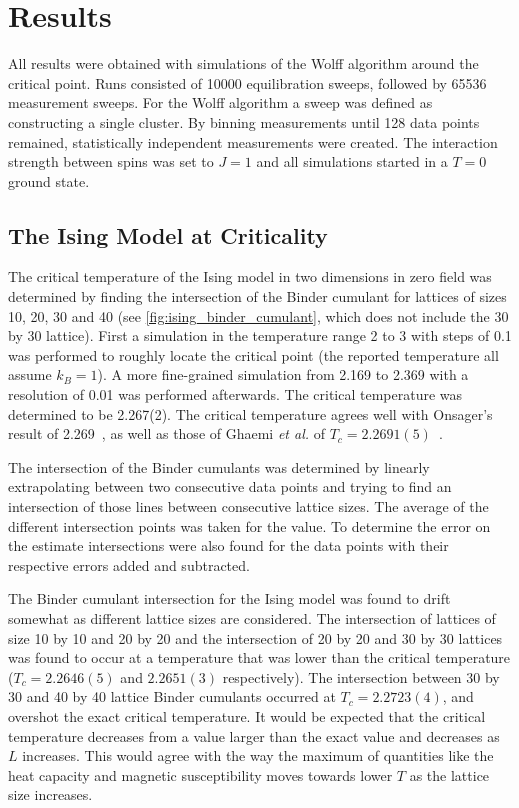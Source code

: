 \documentclass[11pt, a4paper]{report} %
\begin{document}
\chapter{Results}

All results were obtained with simulations of the Wolff algorithm around the critical point.
Runs consisted of 10000 equilibration sweeps, followed by 65536 measurement sweeps.
For the Wolff algorithm a sweep was defined as constructing a single cluster.
By binning measurements until 128 data points remained, statistically independent measurements were created.
The interaction strength between spins was set to \(J=1\) and all simulations started in a \(T=0\) ground state.

\section{The Ising Model at Criticality}

The critical temperature of the Ising model in two dimensions in zero field was determined by finding the intersection of the Binder cumulant for lattices of sizes 10, 20, 30 and 40 (see \cref{fig:ising_binder_cumulant}, which does not include the 30 by 30 lattice).
First a simulation in the temperature range 2 to 3 with steps of 0.1 was performed to roughly locate the critical point (the reported temperature all assume \(k_B = 1\)).
A more fine-grained simulation from 2.169 to 2.369 with a resolution of 0.01 was performed afterwards.
The critical temperature was determined to be 2.267(2).
The critical temperature agrees well with Onsager's result of 2.269~\cite{onsager:1944}, as well as those of Ghaemi \textit{et al.} of \(T_c = 2.2691(5)\)~\cite{ghaemi:2001}.

The intersection of the Binder cumulants was determined by linearly extrapolating between two consecutive data points and trying to find an intersection of those lines between consecutive lattice sizes.
The average of the different intersection points was taken for the value.
To determine the error on the estimate intersections were also found for the data points with their respective errors added and subtracted.

The Binder cumulant intersection for the Ising model was found to drift somewhat as different lattice sizes are considered.
The intersection of lattices of size 10 by 10 and 20 by 20 and the intersection of 20 by 20 and 30 by 30 lattices was found to occur at a temperature that was lower than the critical temperature (\(T_c = 2.2646(5)\) and \(2.2651(3)\) respectively).
The intersection between 30 by 30 and 40 by 40 lattice Binder cumulants occurred at \( T_c = 2.2723(4)\), and overshot the exact critical temperature.
It would be expected that the critical temperature decreases from a value larger than the exact value and decreases as \(L\) increases.
This would agree with the way the maximum of quantities like the heat capacity and magnetic susceptibility moves towards lower \(T\) as the lattice size increases.
\end{document}
